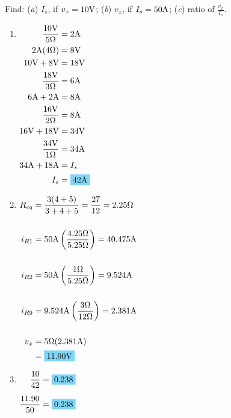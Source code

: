 Find: (\emph{a}) $I_s$, if $v_x=10\qw{\V}$; (\emph{b}) $v_x$, if $I_s=50\qw{\A}$; (\emph{c}) ratio of $\frac{v_x}{I_s}$.

\begin{enumerate}[leftmargin=2cm,labelsep=.5cm,label=\bfseries\alph*)]
\item $
\begin{aligned}[t]
\frac{10\qw{\V}}{5\qw{\ohm}} &= 2\qw{\A} \\
2\qw{\A}(4\qw{\ohm}) &= 8\qw{\V} \\
10\qw{\V}+8\qw{\V} &= 18\qw{\V} \\
\frac{18\qw{\V}}{3\qw{\ohm}} &= 6\qw{\A} \\
6\qw{\A}+2\qw{\A} &= 8\qw{\A} \\
\frac{16\qw{\V}}{2\qw{\ohm}} &= 8\qw{\A} \\
16\qw{\V}+18\qw{\V} &= 34\qw{\V} \\
\frac{34\qw{\V}}{1\qw{\ohm}} &= 34\qw{\A} \\
34\qw{\A}+18\qw{\A}&=I_s \\
I_s&=\hlbox{42\qw{\A}}
\end{aligned} $ 
\\[1cm]

\item $
\begin{aligned}[t]
R_{eq} &= \frac{3(4+5)}{3+4+5} = \frac{27}{12} = 2.25\qw{\ohm} \\[5mm]
i_{R1} &= 50\qw{\A}\left(\frac{4.25\qw{\ohm}}{5.25\qw{\ohm}}\right) = 40.475\qw{\A} \\[5mm]
i_{R2} &= 50\qw{\A}\left(\frac{1\qw{\ohm}}{5.25\qw{\ohm}}\right) = 9.524\qw{\A} \\[5mm]
i_{R9} &= 9.524\qw{\A}\left(\frac{3\qw{\ohm}}{12\qw{\ohm}}\right) = 2.381\qw{\A} \\[5mm]
v_x &= 5\qw{\ohm}(2.381\qw{\A})\\
&= \hlbox{11.90\qw{\V}}
\end{aligned} $
\\[1cm]

\item $
\begin{aligned}[t]
\frac{10}{42} &= \hlbox{0.238} \\[2mm]
\frac{11.90}{50} &= \hlbox{0.238}
\end{aligned} $
\\[1cm]

\end{enumerate}